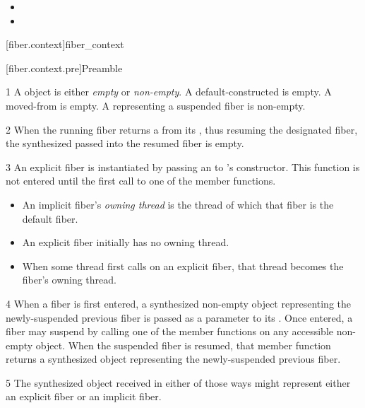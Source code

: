 \begin{itemize}
    \item {}
    \item {}
\end{itemize}


\setcounter{section}{33}
\setcounter{subsection}{11}
\setcounter{secnumdepth}{4}

[fiber.context]{fiber\_context}

[fiber.context.pre]{Preamble}

1 A \fiber object is either \emph{empty} or \emph{non-empty}. A
default-constructed \fiber is empty. A moved-from \fiber is empty. A \fiber
representing a suspended fiber is non-empty.

2 When the running fiber returns a \fiber from its \entryfn, thus resuming the
designated fiber, the synthesized \fiber passed into the resumed fiber is
empty.

3 An explicit fiber is instantiated by passing an \emph{\entryfn} to \fiber's
constructor. This function is not entered until the first call to one of
the \anyresume member functions.

\begin{itemize}
    \item An implicit fiber's \emph{owning thread} is the thread of which that
          fiber is the default fiber.
    \item An explicit fiber initially has no owning thread.
    \item When some thread first calls \anyresume on an explicit fiber, that
          thread becomes the fiber's owning thread.
\end{itemize}

4 When a fiber is first entered, a synthesized non-empty \fiber object
representing the newly-suspended previous fiber is passed as a parameter to
its \entryfn. Once entered, a fiber may suspend by calling one of the \anyresume
member functions on any accessible non-empty \fiber object. When the
suspended fiber is resumed, that member function returns a synthesized \fiber object
representing the newly-suspended previous fiber.

5 The synthesized \fiber object received in either of those ways might
represent either an explicit fiber or an implicit fiber.

